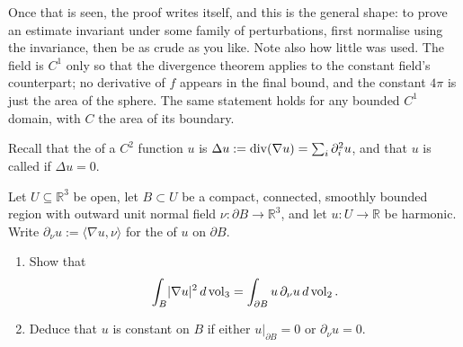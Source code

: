 \begin{example}
\begin{remark}
Once that is seen, the proof writes itself, and this is the general shape: to prove an estimate
invariant under some family of perturbations, first normalise using the invariance, then be as
crude as you like. Note also how little was used. The field is $C^1$ only so that the divergence
theorem applies to the constant field's counterpart; no derivative of $f$ appears in the final
bound, and the constant $4\pi$ is just the area of the sphere. The same statement holds for any
bounded $C^1$ domain, with $C$ the area of its boundary.
\end{remark}
\end{example}

\begin{exercise}
\label{ex:green_first_identity_harmonic}
Recall that the   of a $C^2$ function $u$ is
$\Delta u := \operatorname{div}(\nabla u) = \sum_{i}\partial_i^2 u$, and that $u$ is called
  if $\Delta u = 0$.

Let $U \subseteq \mathbb{R}^3$ be open, let $B \subset U$ be a compact, connected, smoothly
bounded region with outward unit normal field $\nu : \partial B \to \mathbb{R}^3$, and let
$u : U \to \mathbb{R}$ be harmonic. Write $\partial_\nu u := \langle\nabla u,\nu\rangle$ for the
  of $u$ on $\partial B$.
\begin{enumerate}[label=\textbf{(\alph*)}]
  \item Show that
    \[\int_B \lvert\nabla u\rvert^2 \,d\operatorname{vol}_3 = \int_{\partial B} u\,\partial_\nu u \,d\operatorname{vol}_2 .\]
  \item Deduce that $u$ is constant on $B$ if either $u|_{\partial B} = 0$ or
    $\partial_\nu u = 0$.
\end{enumerate}
\end{exercise}

